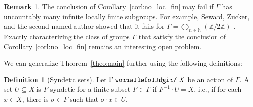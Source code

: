 \documentclass[11pt,reqno,psamsfonts]{amsart}
\theoremstyle{bfnote}
\theoremstyle{definition}
\newtheorem{defn}[theo]{Definition}
\newtheorem{remk}[theo]{Remark}
\theoremstyle{remark}
\newcommand{\0}{\varnothing}
\renewcommand{\leq}{\leqslant}
\newcommand{\red}[1]{{\color{red}#1}}
\newcommand{\todo}[1]{\red{\textbf{\upshape{[#1]}}}}
\newcommand{\emphd}[1]{{\fontseries{b}\selectfont\textsf{#1}}}
\newcommand{\acts}{\mathrel{\reflectbox{$\righttoleftarrow$}}}
\newcommand{\G}{\Gamma}
\newcommand{\N}{\mathbb{N}}
\newcommand{\Z}{\mathbb{Z}}
\numberwithin{equation}{section}
\begin{document}
    \begin{remk}
        The conclusion of Corollary~\ref{corl:no_loc_fin} may fail if $\G$ has uncountably many infinite locally finite subgroups. %
    For example,
    Seward, Zucker, and the second named author showed that  it fails for %
    $\G = \bigoplus_{n \in \N} (\Z/2\Z)$ %
    \cite[Thm.~2.5]{FSZ}. %
    Exactly characterizing the class of groups $\G$ that satisfy %
    the conclusion of Corollary~\ref{corl:no_loc_fin} %
    remains an interesting open problem.
    \end{remk}



    We can generalize Theorem~\ref{theo:main} further using the following definitions:

    \begin{defn}[Syndetic sets]
        Let $\G \acts X$ be an action of $\G$. A set $U \subseteq X$ is \emphd{$F$-syndetic} for a finite subset $F \subset \G$ if $F^{-1} \cdot U = X$, i.e., if for each $x \in X$, there is $\sigma \in F$ such that $\sigma \cdot x \in U$.
    \end{defn}
\end{document}
